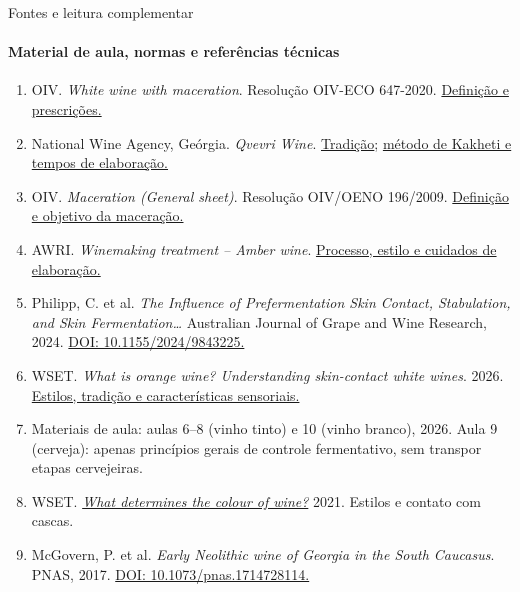 \documentclass[aspectratio=169,11pt]{beamer}
\begin{document}
\begin{frame}[t]{Fontes e leitura complementar}
  \framesubtitle{Material de aula, normas e referências técnicas}
  \vspace{0.12cm}
  \fontsize{9}{11}\selectfont
  \begin{enumerate}
    \setlength{\itemsep}{0.06cm}
    \item OIV. \textit{White wine with maceration}. Resolução OIV-ECO 647-2020.
      \href{https://www.oiv.int/public/medias/7584/oiv-eco-647-2020-en.pdf}{Definição e prescrições.}
    \item National Wine Agency, Geórgia. \textit{Qvevri Wine}.
      \href{https://wine.gov.ge/En/KvevriWine}{Tradição};
      \href{https://www.georgianwine.jp/wine-making/}{método de Kakheti e tempos de elaboração.}
    \item OIV. \textit{Maceration (General sheet)}. Resolução OIV/OENO 196/2009.
      \href{https://www.oiv.int/index.php/node/3466}{Definição e objetivo da maceração.}
    \item AWRI. \textit{Winemaking treatment -- Amber wine}.
      \href{https://www.awri.com.au/industry_support/winemaking_resources/winemaking-practices/winemaking-treatment-amber-wine/}{Processo, estilo e cuidados de elaboração.}
    \item Philipp, C. et al. \textit{The Influence of Prefermentation Skin Contact,
      Stabulation, and Skin Fermentation\ldots} Australian Journal of Grape and Wine Research, 2024.
      \href{https://doi.org/10.1155/2024/9843225}{DOI: 10.1155/2024/9843225.}
    \item WSET. \textit{What is orange wine? Understanding skin-contact white wines}. 2026.
      \href{https://www.wsetglobal.com/knowledge-centre/blog/2026/what-is-orange-wine-understanding-skin-contact-white-wines}{Estilos, tradição e características sensoriais.}
    \item Materiais de aula: aulas 6--8 (vinho tinto) e 10 (vinho branco), 2026.
      Aula 9 (cerveja): apenas princípios gerais de controle fermentativo, sem transpor etapas cervejeiras.
    \item WSET. \href{https://www.wsetglobal.com/knowledge-centre/blog/2021/september/23/what-determines-the-colour-of-wine}{\textit{What determines the colour of wine?}} 2021. Estilos e contato com cascas.
    \item McGovern, P. et al. \textit{Early Neolithic wine of Georgia in the South Caucasus}.
      PNAS, 2017. \href{https://doi.org/10.1073/pnas.1714728114}{DOI: 10.1073/pnas.1714728114.}
  \end{enumerate}
\end{frame}
\end{document}
